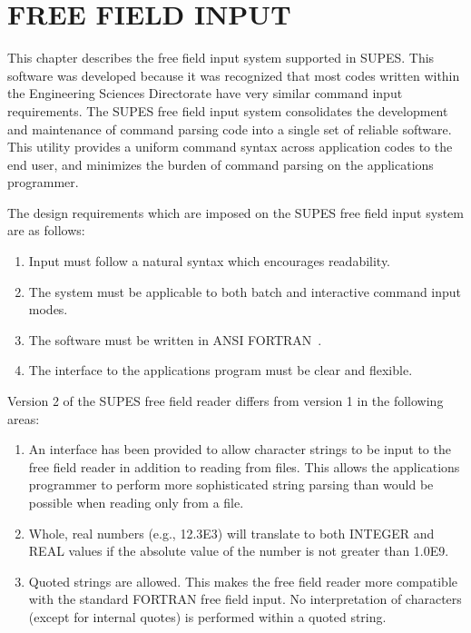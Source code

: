 \chapter{FREE FIELD INPUT}
This chapter describes the free field input system supported in SUPES.  This
software was developed because it was recognized that most codes written
within the Engineering Sciences Directorate have very similar command input
requirements.  The SUPES free field input system consolidates the
development and maintenance of command parsing code into a single set of
reliable software.  This utility provides a uniform command syntax across
application codes to the end user, and minimizes the burden of command
parsing on the applications programmer.

The design requirements which are imposed on the SUPES free field input
system are as follows:
\begin{enumerate}
\item Input must follow a natural syntax which encourages readability.

\item The system must be applicable to both batch and interactive command
input modes.

\item The software must be written in ANSI FORTRAN~\cite{ansi}.

\item The interface to the applications program must be clear and
flexible.
\end{enumerate}

Version 2 of the SUPES free field reader differs from version 1 in the
following areas:
\begin{enumerate}
\item An interface has been provided to allow character strings to be input
to the free field reader in addition to reading from files. This allows the
applications programmer to perform more sophisticated string parsing than
would be possible when reading only from a file.

\item Whole, real numbers (e.g., 12.3E3) will translate to both INTEGER and
REAL values if the absolute value of the number is not greater than
1.0E9.

\item Quoted strings are allowed. This makes the free field reader more
compatible with the standard FORTRAN free field input. No interpretation of
characters (except for internal quotes) is performed within a quoted string.

\end{enumerate}

